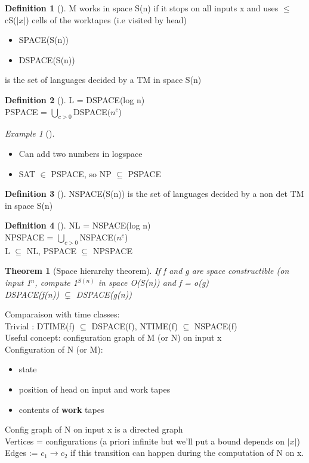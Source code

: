 \documentclass{article}
\newtheorem{theorem}{Theorem}
\theoremstyle{definition}
\newtheorem{definition}{Definition}
\theoremstyle{remark}
\newtheorem*{example}{Example}
\newcommand{\Thm}[3]{\begin{theorem}[#1]\label{#2}#3\end{theorem}}
\newcommand{\Ex}[3]{\begin{example}[#1]\label{#2}#3\end{example}}
\newcommand{\Def}[3]{\begin{definition}[#1]\label{#2}#3\end{definition}}
\begin{document}
\Def{}{}{M works in space S(n) if it stops on all inputs x and uses $\leq$ cS($|x|$) cells of the worktapes (i.e visited by head)
	\begin{itemize}
		\item SPACE(S(n))
		\item DSPACE(S(n))
	\end{itemize}
	 is the set of languages decided by a TM in space S(n)}

\Def{}{}{L = DSPACE(log n)\\
	PSPACE = $\bigcup\limits_{c>0}$DSPACE$(n^c$)}

\Ex{}{}{~\\\begin{itemize}
		\item Can add two numbers in logspace
		\item SAT $\in$ PSPACE, so NP $\subseteq$ PSPACE
	\end{itemize}}
	
\Def{}{}{NSPACE(S(n)) is the set of languages decided by a non det TM in space S(n)}

\Def{}{}{NL = NSPACE(log n)\\
	NPSPACE = $\bigcup\limits_{c>0}$NSPACE$(n^c$)\\
	L $\subseteq$ NL, PSPACE $\subseteq$ NPSPACE}

\Thm{Space hierarchy theorem}{}{If f and g are space constructible (on input 1$^n$, compute 1$^{S(n)}$ in space O(S(n)) and f = o(g)\\
DSPACE(f(n)) $\subsetneq$ DSPACE(g(n))}

Comparaison with time classes:\\
Trivial : DTIME(f) $\subseteq$ DSPACE(f), NTIME(f) $\subseteq$ NSPACE(f)\\

Useful concept: configuration graph of M (or N) on input x\\

Configuration of N (or M):\begin{itemize}
	\item state
	\item position of head on input and work tapes
	\item contents of \textbf{work} tapes
\end{itemize}

Config graph of N on input x is a directed graph\\
Vertices = configurations (a priori infinite but we'll put a bound depends on $|x|$)\\
Edges := $c_1 \rightarrow c_2$ if this transition can happen during the computation of N on x.\\
\end{document}
